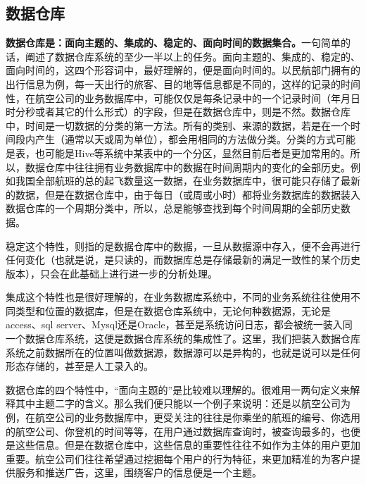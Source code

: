 \subsection{数据仓库}
\par \textbf{数据仓库是：面向主题的、集成的、稳定的、面向时间的数据集合。}一句简单的话，阐述了数据仓库系统的至少一半以上的任务。面向主题的、集成的、稳定的、面向时间的，这四个形容词中，最好理解的，便是面向时间的。以民航部门拥有的出行信息为例，每一天出行的旅客、目的地等信息都是不同的，这样的记录的时间性，在航空公司的业务数据库中，可能仅仅是每条记录中的一个记录时间（年月日时分秒或者其它的什么形式）的字段，但是在数据仓库中，则是不然。数据仓库中，时间是一切数据的分类的第一方法。所有的类别、来源的数据，若是在一个时间段内产生（通常以天或周为单位），都会用相同的方法做分类。分类的方式可能是表，也可能是Hive等系统中某表中的一个分区，显然目前后者是更加常用的。所以，数据仓库中往往拥有业务数据库中的数据在时间周期内的变化的全部历史。例如我国全部航班的总的起飞数量这一数据，在业务数据库中，很可能只存储了最新的数据，但是在数据仓库中，由于每日（或周或小时）都将业务数据库的数据装入数据仓库的一个周期分类中，所以，总是能够查找到每个时间周期的全部历史数据。
\par 稳定这个特性，则指的是数据仓库中的数据，一旦从数据源中存入，便不会再进行任何变化（也就是说，是只读的，而数据库总是存储最新的满足一致性的某个历史版本），只会在此基础上进行进一步的分析处理。
\par 集成这个特性也是很好理解的，在业务数据库系统中，不同的业务系统往往使用不同类型和位置的数据库，但是在数据仓库系统中，无论何种数据源，无论是access、sql server、Mysql还是Oracle，甚至是系统访问日志，都会被统一装入同一个数据仓库系统，这便是数据仓库系统的集成性了。这里，我们把装入数据仓库系统之前数据所在的位置叫做数据源，数据源可以是异构的，也就是说可以是任何形态存储的，甚至是人工录入的。
\par 数据仓库的四个特性中，“面向主题的”是比较难以理解的。很难用一两句定义来解释其中主题二字的含义。那么我们便只能以一个例子来说明：还是以航空公司为例，在航空公司的业务数据库中，更受关注的往往是你乘坐的航班的编号、你选用的航空公司、你登机的时间等等，在用户通过数据库查询时，被查询最多的，也便是这些信息。但是在数据仓库中，这些信息的重要性往往不如作为主体的用户更加重要。航空公司们往往希望通过挖掘每个用户的行为特征，来更加精准的为客户提供服务和推送广告，这里，围绕客户的信息便是一个主题。
